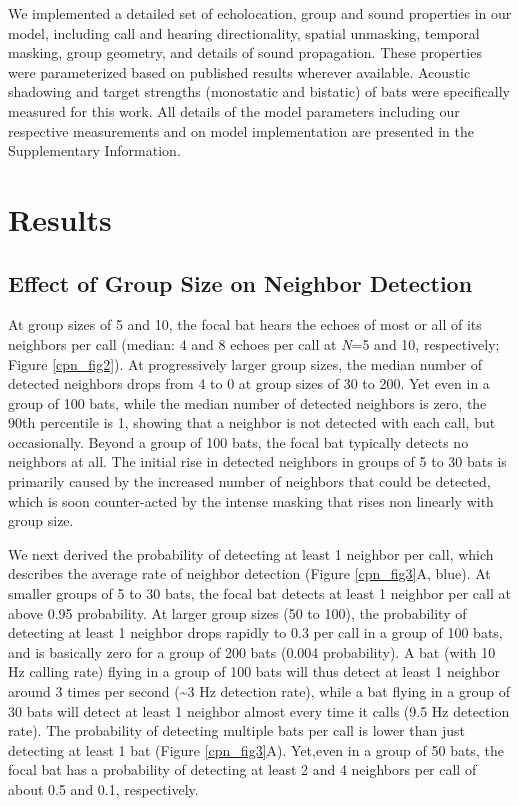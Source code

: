 \documentclass[
]{book}
\begin{document}
We implemented a detailed set of echolocation, group and sound properties in our model, including call and hearing directionality, spatial unmasking, temporal masking, group geometry, and details of sound propagation. These properties were parameterized based on published results wherever available. Acoustic shadowing and target strengths (monostatic and bistatic) of bats were specifically measured for this work. All details of the model parameters including our respective measurements and on model implementation are presented in the Supplementary Information.

\hypertarget{results}{%
\section{Results}\label{results}}

\hypertarget{effect-of-group-size-on-neighbor-detection}{%
\subsection{Effect of Group Size on Neighbor Detection}\label{effect-of-group-size-on-neighbor-detection}}

At group sizes of 5 and 10, the focal bat hears the echoes of most or all of its neighbors per call (median: 4 and 8 echoes per call at \emph{N}=5 and 10, respectively; Figure \ref{cpn_fig2}). At progressively larger group sizes, the median number of detected neighbors drops from 4 to 0 at group sizes of 30 to 200. Yet even in a group of 100 bats, while the median number of detected neighbors is zero, the 90th percentile is 1, showing that a neighbor is not detected with each call, but occasionally. Beyond a group of 100 bats, the focal bat typically detects no neighbors at all. The initial rise in detected neighbors in groups of 5 to 30 bats is primarily caused by the increased number of neighbors that could be detected, which is soon counter-acted by the intense masking that rises non linearly with group size.

We next derived the probability of detecting at least 1 neighbor per call, which describes the average rate of neighbor detection (Figure \ref{cpn_fig3}A, blue). At smaller groups of 5 to 30 bats, the focal bat detects at least 1 neighbor per call at above 0.95 probability. At larger group sizes (50 to 100), the probability of detecting at least 1 neighbor drops rapidly to 0.3 per call in a group of 100 bats, and is basically zero for a group of 200 bats (0.004 probability). A bat (with 10 Hz calling rate) flying in a group of 100 bats will thus detect at least 1 neighbor around 3 times per second (\textasciitilde 3 Hz detection rate), while a bat flying in a group of 30 bats will detect at least 1 neighbor almost every time it calls (9.5 Hz detection rate). The probability of detecting multiple bats per call is lower than just detecting at least 1 bat (Figure \ref{cpn_fig3}A). Yet,even in a group of 50 bats, the focal bat has a probability of detecting at least 2 and 4 neighbors per call of about 0.5 and 0.1, respectively.
\end{document}
